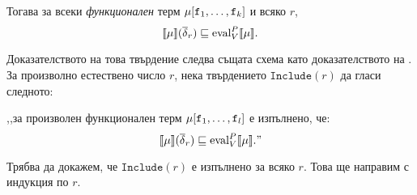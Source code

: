\begin{prop}
  \label{pr:rec:op-value-inclusion2}
  Тогава за всеки {\em функционален} терм $\mu[\texttt{f}_1,\dots,\texttt{f}_k]$ и всяко $r$,
  \[\llbracket{\mu}\rrbracket(\overline{\delta}_r) \sqsubseteq \text{eval}^P_V\llbracket{{\mu}}\rrbracket.\]
\end{prop}
\begin{hint}
  
  Доказателството на това твърдение следва същата схема като доказателството на .
  За произволно естествено число $r$, нека твърдението $\texttt{Include}(r)$ да гласи следното:

  ,,за произволен функционален терм $\mu[\texttt{f}_1,\dots,\texttt{f}_l]$
  е изпълнено, че:
  \[\llbracket{\mu}\rrbracket(\overline{\delta}_r) \sqsubseteq \text{eval}^P_V\llbracket{{\mu}}\rrbracket.\text{''}\]
  
  Трябва да докажем, че $\texttt{Include}(r)$ е изпълнено за всяко $r$.
  Това ще направим с индукция по $r$.



\end{hint}
